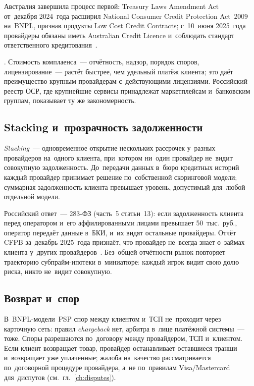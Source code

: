 Австралия завершила процесс первой: Treasury Laws Amendment Act от~декабря
2024~года расширил National Consumer Credit Protection Act~2009 на~BNPL,
признав продукты Low Cost Credit Contracts; с~10~июня 2025~года провайдеры
обязаны иметь Australian Credit Licence и~соблюдать стандарт ответственного
кредитования~\cite{australia-bnpl-act-2025}.

. Стоимость
комплаенса~--- отчётность, надзор, порядок споров, лицензирование~---
растёт быстрее, чем удельный платёж клиента; это даёт преимущество крупным
провайдерам с~действующими лицензиями. Российский реестр ОСР, где
крупнейшие сервисы принадлежат маркетплейсам и~банковским группам, показывает
ту же закономерность.

\subsection*{Stacking и~прозрачность задолженности}

\textit{Stacking}~--- одновременное открытие нескольких рассрочек у~разных провайдеров
на~одного клиента, при~котором ни~один провайдер не~видит совокупную
задолженность. До~передачи данных в~бюро кредитных историй каждый провайдер
принимает решение по~собственной скоринговой модели; суммарная задолженность
клиента превышает уровень, допустимый для~любой отдельной модели.

Российский ответ~--- 283-ФЗ (часть~5 статьи~13): если задолженность клиента
перед оператором и~его аффилированными лицами превышает 50~тыс.\ руб.,
оператор передаёт данные в~БКИ, и~их видят остальные провайдеры.
Отчёт CFPB за~декабрь 2025~года признаёт, что провайдер не~всегда знает о~займах
клиента у~других провайдеров~\cite{cfpb-bnpl-2025}. Без~общей отчётности рынок
повторяет траекторию субпрайм-ипотеки в~миниатюре: каждый игрок видит свою долю
риска, никто не~видит совокупную.

\subsection*{Возврат и~спор}

В~BNPL-модели~PSP спор между клиентом и~ТСП не~проходит через карточную сеть:
правил \textit{chargeback} нет, арбитра в~лице платёжной системы~--- тоже. Споры
разрешаются по~договору между провайдером, ТСП и~клиентом. Если клиент
возвращает товар, провайдер останавливает оставшиеся транши и~возвращает уже
уплаченные; жалоба на~качество рассматривается по~договорной процедуре
провайдера, а~не по~правилам Visa/Mastercard для~диспутов
(см.~гл.~\ref{ch:disputes}).

